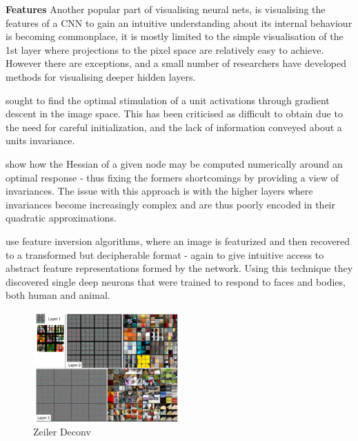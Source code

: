 \documentclass[a4paper,11pt,titlepage]{article}
\begin{document}
\textbf{Features}
		Another popular part of visualising neural nets, is visualising the features of a CNN to gain an intuitive understanding about its internal behaviour is becoming commonplace, it is mostly limited to the simple visualisation of the 1st layer where projections to the pixel space are relatively easy to achieve. However there are exceptions, and a small number of researchers have developed methods for visualising deeper hidden layers.
		\par 
		\textbf{\cite{Erhan2009}} sought to find the optimal stimulation of a unit activations through gradient descent in the image space. This has been criticised as difficult to obtain due to the need for careful initialization, and the lack of information conveyed about a units invariance. 
		\par 
		\textbf{\cite{Le2010}} show how the Hessian of a given node may be computed numerically around an optimal response - thus fixing the formers shortcomings by providing a view of invariances. The issue with this approach is with the higher layers where invariances become increasingly complex and are thus poorly encoded in their quadratic approximations. 
		\par 
		\textbf{\cite{Vondrick2013a}} use feature inversion algorithms, where an image is featurized and then recovered to a transformed but decipherable format - again to give intuitive access to abstract feature representations formed by the network. Using this technique they discovered single deep neurons that were trained to respond to faces and bodies, both human and animal. 
		\par
		
		\begin{figure}[H]
			\centering	
    			\includegraphics[width=0.5\textwidth]{img/zeiler_deconv.png} 
    			\caption{Zeiler Deconv}%
 		\end{figure}
 		
\end{document}
